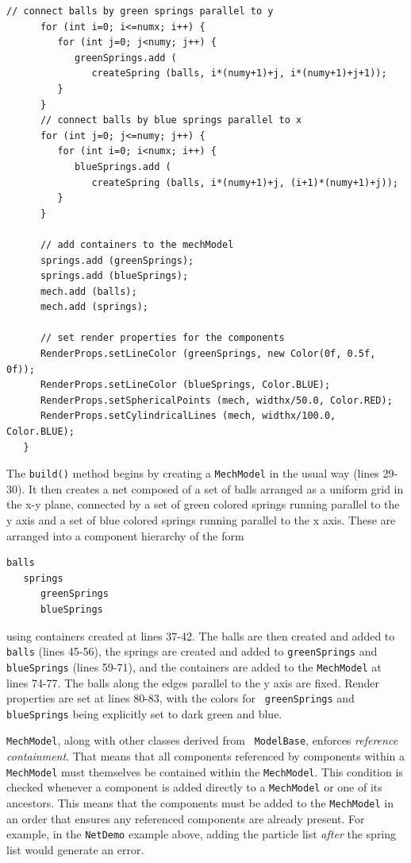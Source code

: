 \begin{lstlisting}[]
      // connect balls by green springs parallel to y
      for (int i=0; i<=numx; i++) {
         for (int j=0; j<numy; j++) {
            greenSprings.add (
               createSpring (balls, i*(numy+1)+j, i*(numy+1)+j+1));
         }
      }
      // connect balls by blue springs parallel to x
      for (int j=0; j<=numy; j++) {
         for (int i=0; i<numx; i++) {
            blueSprings.add (
               createSpring (balls, i*(numy+1)+j, (i+1)*(numy+1)+j));
         }
      }

      // add containers to the mechModel
      springs.add (greenSprings);
      springs.add (blueSprings);
      mech.add (balls);
      mech.add (springs);

      // set render properties for the components      
      RenderProps.setLineColor (greenSprings, new Color(0f, 0.5f, 0f));
      RenderProps.setLineColor (blueSprings, Color.BLUE);
      RenderProps.setSphericalPoints (mech, widthx/50.0, Color.RED);
      RenderProps.setCylindricalLines (mech, widthx/100.0, Color.BLUE);
   }
\end{lstlisting}
\lstset{numbers=none}
%
The {\tt build()} method begins by creating a {\tt MechModel} in the
usual way (lines 29-30). It then creates a net composed of a set of
balls arranged as a uniform grid in the x-y plane, connected by a set
of green colored springs running parallel to the y axis and a set of
blue colored springs running parallel to the x axis. These are
arranged into a component hierarchy of the form
%
\begin{lstlisting}[]
   balls
   springs
      greenSprings
      blueSprings
\end{lstlisting}
%
using containers created at lines 37-42. The balls are then created
and added to {\tt balls} (lines 45-56), the springs are created and
added to {\tt greenSprings} and {\tt blueSprings} (lines 59-71), and
the containers are added to the {\tt MechModel} at lines 74-77.
The balls along the edges parallel to the y axis are fixed.
Render properties are set at lines 80-83, with the colors for {\tt
greenSprings} and {\tt blueSprings} being explicitly set to dark green
and blue.

\begin{sideblock}
{\tt MechModel}, along with other classes derived from {\tt
ModelBase}, enforces {\it reference containment}. That means that all
components referenced by components within a {\tt MechModel} must
themselves be contained within the {\tt MechModel}.  This condition is
checked whenever a component is added directly to a {\tt MechModel} or
one of its ancestors. This means that the components must be added to
the {\tt MechModel} in an order that ensures any referenced components are
already present. For example, in the {\tt NetDemo} example above, adding the
particle list {\it after} the spring list would generate an error.
\end{sideblock}

